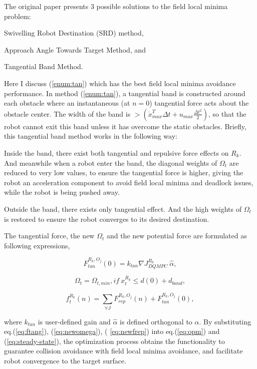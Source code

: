 \documentclass[12pt]{article}
\begin{document}
The original paper presents 3 possible solutions to the field local minima problem: 
\begin{inparaenum}[(i)]
\item Swivelling Robot Destination (SRD) method,
\item Approach Angle Towards Target Method, and
\item Tangential Band Method. \label{enum:tan}
\end{inparaenum}
Here I discuss (\ref{enum:tan}) which has the best field local minima avoidance performance. 
In method (\ref{enum:tan}), a tangential band is constructed around each obstacle where an instantaneous (at $n=0$) tangential force acts about the obstacle center. The width of the band is $>(\dot{x}_{max}^{T}\Delta{t}+u_{max}\frac{\Delta{t}^{2}}{2})$, so that the robot cannot exit this band unless it has overcome the static obstacles. Briefly, this tangential band method works in the following way: 
\begin{inparaenum}[1)]
\item Inside the band, there exist both tangential and repulsive force effects on $R_{k}$. And meanwhile when a robot enter the band, the diagonal weights of $\Omega_{t}$ are reduced to very low values, to ensure the tangential force is higher, giving the robot an acceleration component to avoid field local minima and deadlock issues, while the robot is being pushed away.
\item Outside the band, there exists only tangential effect. And the high weights of $\Omega_{t}$ is restored to ensure the robot converges to its desired destination.
\end{inparaenum}

The tangential force, the new $\Omega_{t}$ and the new potential force are formulated as following expressions,

\begin{equation}
F_{tan}^{R_{k},O_{j}}(0)=k_{tan}\nabla{J_{DQMPC}^{R_{k}}}\ \hat{\alpha}, 
\label{eq:ftang}
\end{equation}

\begin{equation}
\Omega_{t}=\Omega_{t,min}, if\ x_{t}^{R_{k}}\leq d(0)+d_{band},
\label{eq:newomega}
\end{equation}

\begin{equation}
f_{t}^{R_{k}}(n)=\sum_{\forall{J}}F_{rep}^{R_{k},O_{j}}(n)+F_{tan}^{R_{k},O_{j}}(0),
\label{eq:newfrep}
\end{equation}

where $k_{tan}$ is user-defined gain and $\hat{\alpha}$ is defined orthogonal to $\alpha$. By substituting eq.(\ref{eq:ftang}), (\ref{eq:newomega}), ( \ref{eq:newfrep}) into eq.(\ref{eq:opm}) and (\ref{eq:steady-state}), the optimization process obtains the functionality to guarantee collision avoidance with field local minima avoidance, and facilitate robot convergence to the target surface.



\end{document}
